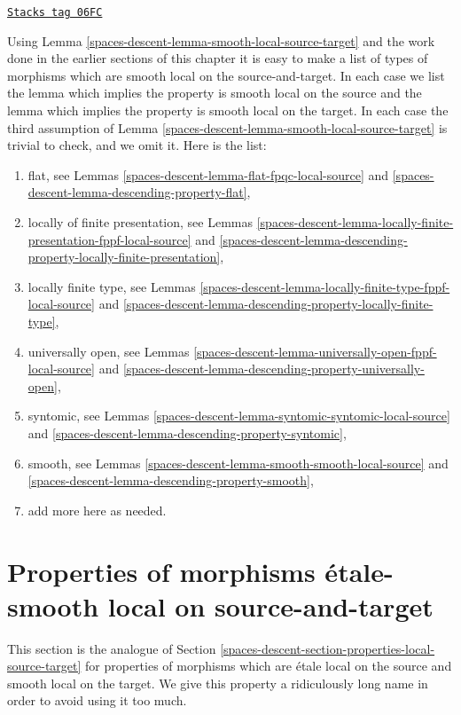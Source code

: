 \begin{remark}
\label{spaces-descent-remark-list-local-source-target}
\href{https://stacks.math.columbia.edu/tag/06FC}{\texttt{Stacks tag 06FC}}

Using
Lemma \ref{spaces-descent-lemma-smooth-local-source-target}
and the work done in the earlier sections of this chapter it is easy
to make a list of types of morphisms which are smooth local on the
source-and-target. In each case we list the lemma which implies
the property is smooth local on the source and the lemma which implies
the property is smooth local on the target. In each case the third assumption
of
Lemma \ref{spaces-descent-lemma-smooth-local-source-target}
is trivial to check, and we omit it. Here is the list:
\begin{enumerate}
\item flat, see
Lemmas \ref{spaces-descent-lemma-flat-fpqc-local-source} and
\ref{spaces-descent-lemma-descending-property-flat},
\item locally of finite presentation, see
Lemmas \ref{spaces-descent-lemma-locally-finite-presentation-fppf-local-source} and
\ref{spaces-descent-lemma-descending-property-locally-finite-presentation},
\item locally finite type, see
Lemmas \ref{spaces-descent-lemma-locally-finite-type-fppf-local-source} and
\ref{spaces-descent-lemma-descending-property-locally-finite-type},
\item universally open, see
Lemmas \ref{spaces-descent-lemma-universally-open-fppf-local-source} and
\ref{spaces-descent-lemma-descending-property-universally-open},
\item syntomic, see
Lemmas \ref{spaces-descent-lemma-syntomic-syntomic-local-source} and
\ref{spaces-descent-lemma-descending-property-syntomic},
\item smooth, see
Lemmas \ref{spaces-descent-lemma-smooth-smooth-local-source} and
\ref{spaces-descent-lemma-descending-property-smooth},
\item add more here as needed.
\end{enumerate}
\end{remark}

\section{Properties of morphisms \'etale-smooth local on source-and-target}
\label{spaces-descent-section-properties-etale-smooth-local-source-target}
This section is the analogue of
Section \ref{spaces-descent-section-properties-local-source-target}
for properties of morphisms which are \'etale local
on the source and smooth local on the target.
We give this property a ridiculously long name
in order to avoid using it too much.

